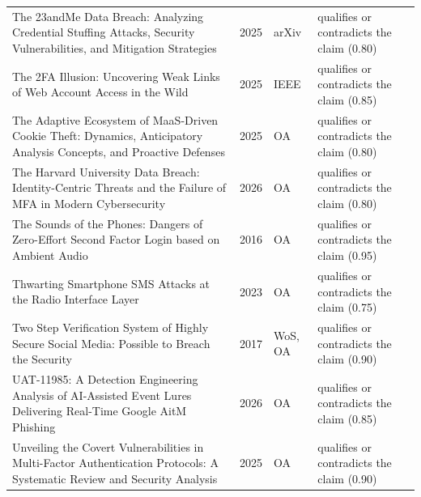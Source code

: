 \begin{longtable}{@{}%
  >{\raggedright\arraybackslash}p{}c%
  >{\raggedright\arraybackslash}p{}%
  >{\raggedright\arraybackslash}p{}@{}}
The 23andMe Data Breach: Analyzing Credential Stuffing Attacks, Security Vulnerabilities, and Mitigation Strategies & 2025 & arXiv & qualifies or contradicts the claim (0.80) \\
The 2FA Illusion: Uncovering Weak Links of Web Account Access in the Wild & 2025 & IEEE & qualifies or contradicts the claim (0.85) \\
The Adaptive Ecosystem of MaaS-Driven Cookie Theft: Dynamics, Anticipatory Analysis Concepts, and Proactive Defenses & 2025 & OA & qualifies or contradicts the claim (0.80) \\
The Harvard University Data Breach: Identity-Centric Threats and the Failure of MFA in Modern Cybersecurity & 2026 & OA & qualifies or contradicts the claim (0.80) \\
The Sounds of the Phones: Dangers of Zero-Effort Second Factor Login based on Ambient Audio & 2016 & OA & qualifies or contradicts the claim (0.95) \\
Thwarting Smartphone SMS Attacks at the Radio Interface Layer & 2023 & OA & qualifies or contradicts the claim (0.75) \\
Two Step Verification System of Highly Secure Social Media: Possible to Breach the Security & 2017 & WoS, OA & qualifies or contradicts the claim (0.90) \\
UAT-11985: A Detection Engineering Analysis of AI-Assisted Event Lures Delivering Real-Time Google AitM Phishing & 2026 & OA & qualifies or contradicts the claim (0.85) \\
Unveiling the Covert Vulnerabilities in Multi-Factor Authentication Protocols: A Systematic Review and Security Analysis & 2025 & OA & qualifies or contradicts the claim (0.90) \\
\end{longtable}
\endgroup
